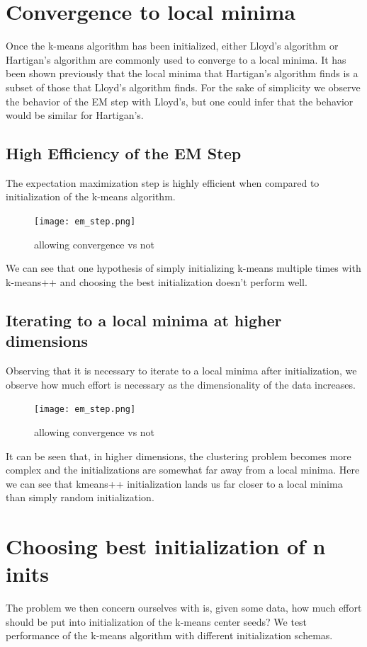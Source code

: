 \documentclass{article}
\begin{document}
\section{Convergence to local minima}
Once the k-means algorithm has been initialized, either Lloyd's algorithm or Hartigan's algorithm are commonly used to converge to a local minima. It has been shown previously that the local minima that Hartigan's algorithm finds is a subset of those that Lloyd's algorithm finds. For the sake of simplicity we observe the behavior of the EM step with Lloyd's, but one could infer that the behavior would be similar for Hartigan's.

\subsection{High Efficiency of the EM Step}
The expectation maximization step is highly efficient when compared to initialization of the k-means algorithm.

\begin{figure}[!ht]
  \centering
  \texttt{[image: em\_step.png]}
  \caption{allowing convergence vs not}
\end{figure}

We can see that one hypothesis of simply initializing k-means multiple times with k-means++ and choosing the best initialization doesn't perform well.

\subsection{Iterating to a local minima at higher dimensions}
Observing that it is necessary to iterate to a local minima after initialization, we observe how much effort is necessary as the dimensionality of the data increases.

\begin{figure}[!ht]
  \centering
  \texttt{[image: em\_step.png]}
  \caption{allowing convergence vs not}
\end{figure}

It can be seen that, in higher dimensions, the clustering problem becomes more complex and the initializations are somewhat far away from a local minima. Here we can see that kmeans++ initialization lands us far closer to a local minima than simply random initialization.

\section{Choosing best initialization of n inits}
The problem we then concern ourselves with is, given some data, how much effort should be put into initialization of the k-means center seeds? We test performance of the k-means algorithm with different initialization schemas.
\end{document}
